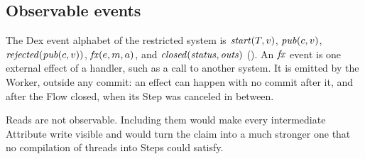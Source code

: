 \subsection{Observable events}
\label{sec:dex-obs}

The Dex event alphabet \Obs{} of the restricted system is
$\mathit{start}(T, v)$, $\mathit{pub}(c, v)$, $\mathit{rejected}(\mathit{pub}(c, v))$,
$\mathit{fx}(e, m, a)$, and $\mathit{closed}(\mathit{status}, \mathit{outs})$
(). An $\mathit{fx}$ event is one external effect of a handler,
such as a call to another system. It is emitted by the Worker, outside any
commit: an effect can happen with no commit after it, and after the Flow
closed, when its Step was canceled in between.

Reads are not observable. Including them would make every intermediate
Attribute write visible and would turn the claim into a much stronger one
that no compilation of threads into Steps could satisfy.
